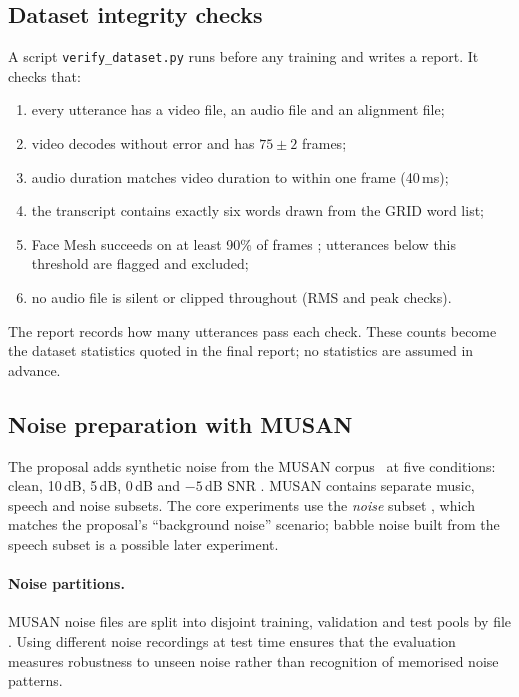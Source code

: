 \subsection{Dataset integrity checks}
A script \texttt{verify\_dataset.py} runs before any training and writes a
report. It checks that:
\begin{enumerate}
  \item every utterance has a video file, an audio file and an alignment file;
  \item video decodes without error and has $75 \pm 2$ frames;
  \item audio duration matches video duration to within one frame (40\,ms);
  \item the transcript contains exactly six words drawn from the GRID word list;
  \item Face Mesh succeeds on at least 90\% of frames \rec; utterances below
        this threshold are flagged and excluded;
  \item no audio file is silent or clipped throughout (RMS and peak checks).
\end{enumerate}
The report records how many utterances pass each check. These counts become
the dataset statistics quoted in the final report; no statistics are assumed
in advance.

\subsection{Noise preparation with MUSAN}
\label{sec:noise}
The proposal adds synthetic noise from the MUSAN corpus~\cite{snyder2015} at
five conditions: clean, 10\,dB, 5\,dB, 0\,dB and $-5$\,dB SNR \spec. MUSAN
contains separate music, speech and noise subsets. The core experiments use the
\emph{noise} subset \rec, which matches the proposal's ``background noise''
scenario; babble noise built from the speech subset is a possible later
experiment.

\paragraph{Noise partitions.} MUSAN noise files are split into disjoint
training, validation and test pools by file \rec. Using different noise
recordings at test time ensures that the evaluation measures robustness to
unseen noise rather than recognition of memorised noise patterns.


